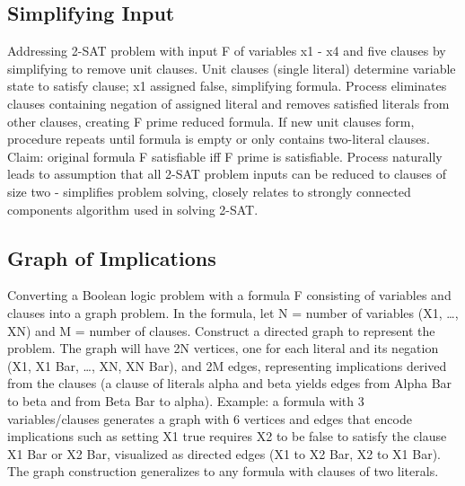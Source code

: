 \subsection*{Simplifying Input}
Addressing 2-SAT problem with input F of variables x1 - x4 and five clauses by simplifying to remove unit clauses.
Unit clauses (single literal) determine variable state to satisfy clause; x1 assigned false, simplifying formula.
Process eliminates clauses containing negation of assigned literal and removes satisfied literals from other clauses, creating F prime reduced formula.
If new unit clauses form, procedure repeats until formula is empty or only contains two-literal clauses.
Claim: original formula F satisfiable iff F prime is satisfiable.
Process naturally leads to assumption that all 2-SAT problem inputs can be reduced to clauses of size two - simplifies problem solving, closely relates to strongly connected components algorithm used in solving 2-SAT\@.

\subsection*{Graph of Implications}
Converting a Boolean logic problem with a formula F consisting of variables and clauses into a graph problem.
In the formula, let N = number of variables (X1, \ldots, XN) and M = number of clauses.
Construct a directed graph to represent the problem.
The graph will have 2N vertices, one for each literal and its negation (X1, X1 Bar, \ldots, XN, XN Bar), and 2M edges, representing implications derived from the clauses (a clause of literals alpha and beta yields edges from Alpha Bar to beta and from Beta Bar to alpha).
Example: a formula with 3 variables/clauses generates a graph with 6 vertices and edges that encode implications such as setting X1 true requires X2 to be false to satisfy the clause X1 Bar or X2 Bar, visualized as directed edges (X1 to X2 Bar, X2 to X1 Bar).
The graph construction generalizes to any formula with clauses of two literals.

